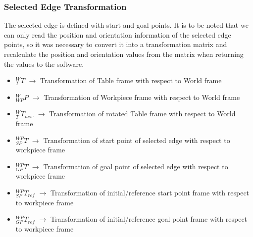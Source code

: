 \subsubsection{Selected Edge Transformation}
The selected edge is defined with start and goal points. It is to be noted that we can only read the position and orientation information of the selected edge points, so it was necessary to convert it into a transformation matrix and recalculate the position and orientation values from the matrix when returning the values to the software.
\begin{itemize}
	\item $_{T}^{W}T$ $\rightarrow$ Transformation of Table frame with respect to World frame
	\item $_{WP}^{W}P$ $\rightarrow$ Transformation of Workpiece frame with respect to World frame
	\item $_{T}^{W}T_{new}$ $\rightarrow$ Transformation of rotated Table frame with respect to World frame
	\item $_{SP}^{WP}T$ $\rightarrow$ Transformation of start point of selected edge with respect to workpiece frame 
	\item $_{GP}^{WP}T$ $\rightarrow$ Transformation of goal point of selected edge with respect to workpiece frame
	\item $_{SP}^{WP}T_{ref}$ $\rightarrow$ Transformation of initial/reference start point frame with respect to workpiece frame
	\item $_{GP}^{WP}T_{ref}$ $\rightarrow$ Transformation of initial/reference goal point frame with respect to workpiece frame
\end{itemize} 
